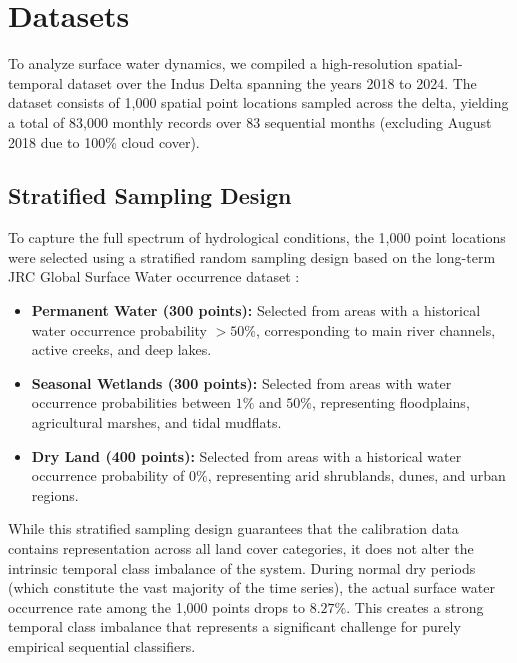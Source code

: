 \section{Datasets}
To analyze surface water dynamics, we compiled a high-resolution spatial-temporal dataset over the Indus Delta spanning the years 2018 to 2024. The dataset consists of 1,000 spatial point locations sampled across the delta, yielding a total of 83,000 monthly records over 83 sequential months (excluding August 2018 due to 100\% cloud cover).

\subsection{Stratified Sampling Design}
To capture the full spectrum of hydrological conditions, the 1,000 point locations were selected using a stratified random sampling design based on the long-term JRC Global Surface Water occurrence dataset \citep{Pekel2016Highresolution}:
\begin{itemize}
    \item \textbf{Permanent Water (300 points):} Selected from areas with a historical water occurrence probability $> 50\%$, corresponding to main river channels, active creeks, and deep lakes.
    \item \textbf{Seasonal Wetlands (300 points):} Selected from areas with water occurrence probabilities between $1\%$ and $50\%$, representing floodplains, agricultural marshes, and tidal mudflats.
    \item \textbf{Dry Land (400 points):} Selected from areas with a historical water occurrence probability of $0\%$, representing arid shrublands, dunes, and urban regions.
\end{itemize}

While this stratified sampling design guarantees that the calibration data contains representation across all land cover categories, it does not alter the intrinsic temporal class imbalance of the system. During normal dry periods (which constitute the vast majority of the time series), the actual surface water occurrence rate among the 1,000 points drops to $8.27\%$. This creates a strong temporal class imbalance that represents a significant challenge for purely empirical sequential classifiers.

